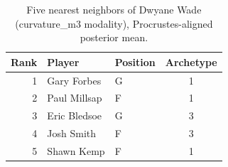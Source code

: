 \begin{table}[htbp]
  \centering\small
  \begin{tabular}{rllc}
    \toprule
    Rank & Player & Position & Archetype \\
    \midrule
    1 & Gary Forbes & G & 1 \\
    2 & Paul Millsap & F & 1 \\
    3 & Eric Bledsoe & G & 3 \\
    4 & Josh Smith & F & 3 \\
    5 & Shawn Kemp & F & 1 \\
    \bottomrule
  \end{tabular}
  \caption{Five nearest neighbors of Dwyane Wade (curvature_m3 modality), Procrustes-aligned posterior mean.}
  \label{tab:Dwyane_Wade_neighbors_curvature_m3}
\end{table}

